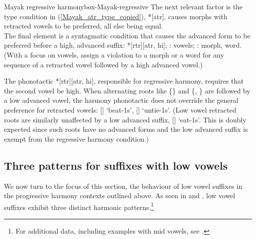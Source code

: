 \begin{dadpbox}{Mayak regressive harmony}{box-Mayak-regressive}
The next relevant factor is the type condition in (\ref{Mayak_atr_type_copied}), *[atr], causes morphs with retracted vowels to be preferred, all else being equal. \\

The final element is a syntagmatic condition that causes the advanced form to be preferred before a high, advanced suffix: {*}[rtr][atr, hi]; \tier: vowels; \dom: morph, word. (With a focus on vowels, assign a violation to a morph or a word for any sequence of a retracted vowel followed by a high advanced vowel.)\\

The phonotactic {*}[rtr][atr, hi], responsible for regressive harmony, requires that the second vowel be high. When alternating roots like \{\} and \{, \} are followed by a low advanced vowel, the harmony phonotactic does not override the general preference for retracted vowels: [] `beat-{\sc 1s}', [] `untie-{\sc 1s}'. (Low vowel retracted roots are similarly unaffected by a low advanced suffix, [] `eat-{\sc 1s}'. This is doubly expected since such roots have no advanced forms and the low advanced suffix is exempt from the regressive harmony condition.)
\end{dadpbox}

\subsection{Three patterns for suffixes with low vowels}

We now turn to the focus of this section, the behaviour of low vowel suffixes in the progressive harmony contexts outlined above. As seen in  and , low vowel suffixes exhibit three distinct harmonic patterns.\footnote{For additional data, including examples with mid vowels, see \citet{Andersen:1999-Vs, Andersen:2000}.}


